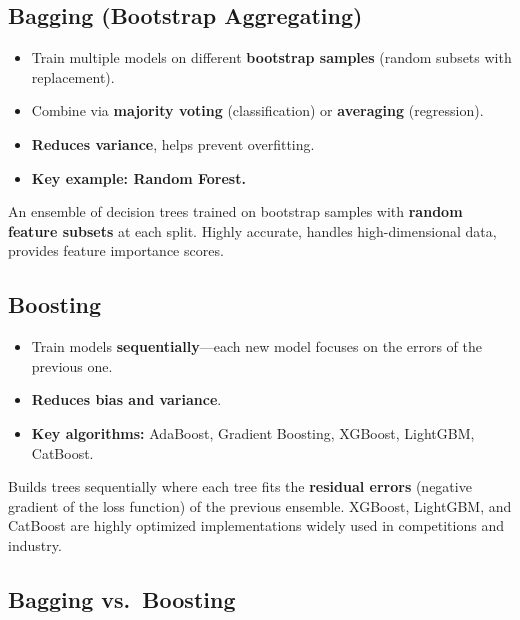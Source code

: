 \documentclass[11pt,a4paper]{article}
\begin{document}
\subsection{Bagging (Bootstrap Aggregating)}
\begin{itemize}[leftmargin=*]
  \item Train multiple models on different \textbf{bootstrap samples} (random subsets with replacement).
  \item Combine via \textbf{majority voting} (classification) or \textbf{averaging} (regression).
  \item \textbf{Reduces variance}, helps prevent overfitting.
  \item \textbf{Key example: Random Forest.}
\end{itemize}

\begin{definitionbox}
An ensemble of decision trees trained on bootstrap samples with \textbf{random feature subsets} at each split. Highly accurate, handles high-dimensional data, provides feature importance scores.
\end{definitionbox}

\subsection{Boosting}
\begin{itemize}[leftmargin=*]
  \item Train models \textbf{sequentially}---each new model focuses on the errors of the previous one.
  \item \textbf{Reduces bias and variance}.
  \item \textbf{Key algorithms:} AdaBoost, Gradient Boosting, XGBoost, LightGBM, CatBoost.
\end{itemize}

\begin{definitionbox}
Builds trees sequentially where each tree fits the \textbf{residual errors} (negative gradient of the loss function) of the previous ensemble. XGBoost, LightGBM, and CatBoost are highly optimized implementations widely used in competitions and industry.
\end{definitionbox}

\subsection{Bagging vs.\ Boosting}
\end{document}
